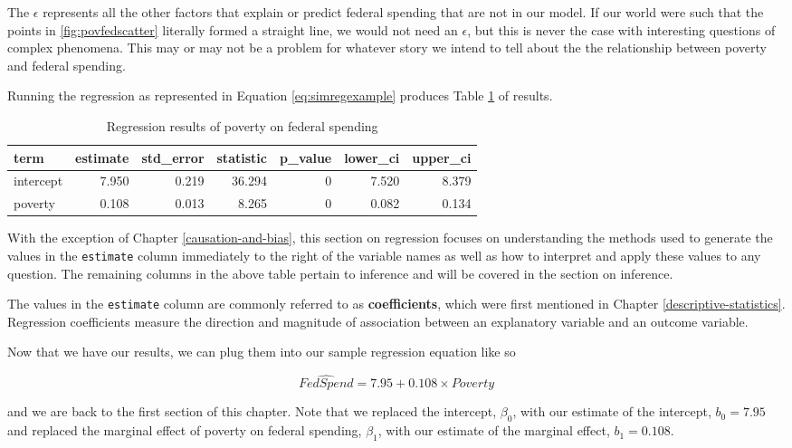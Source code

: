 \documentclass[
]{book}
\begin{document}
The \(\epsilon\) represents all the other factors that explain or predict federal spending that are not in our model. If our world were such that the points in \ref{fig:povfedscatter} literally formed a straight line, we would not need an \(\epsilon\), but this is never the case with interesting questions of complex phenomena. This may or may not be a problem for whatever story we intend to tell about the the relationship between poverty and federal spending.

Running the regression as represented in Equation \eqref{eq:simregexample} produces Table \ref{tab:simpregextab} of results.

\begin{table}

\caption{\label{tab:simpregextab}Regression results of poverty on federal spending}
\centering
\begin{tabular}[t]{l|r|r|r|r|r|r}
\hline
term & estimate & std\_error & statistic & p\_value & lower\_ci & upper\_ci\\
\hline
intercept & 7.950 & 0.219 & 36.294 & 0 & 7.520 & 8.379\\
\hline
poverty & 0.108 & 0.013 & 8.265 & 0 & 0.082 & 0.134\\
\hline
\end{tabular}
\end{table}

With the exception of Chapter \ref{causation-and-bias}, this section on regression focuses on understanding the methods used to generate the values in the \texttt{estimate} column immediately to the right of the variable names as well as how to interpret and apply these values to any question. The remaining columns in the above table pertain to inference and will be covered in the section on inference.

The values in the \texttt{estimate} column are commonly referred to as \textbf{coefficients}, which were first mentioned in Chapter \ref{descriptive-statistics}. Regression coefficients measure the direction and magnitude of association between an explanatory variable and an outcome variable.

Now that we have our results, we can plug them into our sample regression equation like so

\begin{equation}
\hat{FedSpend}=7.95+0.108 \times Poverty
\label{eq:simregresults}
\end{equation}

and we are back to the first section of this chapter. Note that we replaced the intercept, \(\beta_0\), with our estimate of the intercept, \(b_0=7.95\) and replaced the marginal effect of poverty on federal spending, \(\beta_1\), with our estimate of the marginal effect, \(b_1=0.108\).
\end{document}
